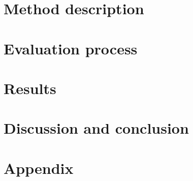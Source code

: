 \documentclass[fleqn]{IOS-Book-Article}
\begin{document}


\section{Method description} \label{sec:experiments}



\section{Evaluation process}


\section{Results} \label{sec:results}



\section{Discussion and conclusion} \label{sec:conclusion}


\newpage

\section{Appendix}

\end{document}
